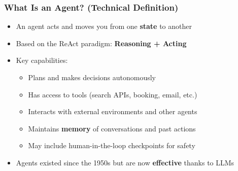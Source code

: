 \begin{frame}[fragile]\frametitle{What Is an Agent? (Technical Definition)}
\begin{itemize}
    \item An agent acts and moves you from one \textbf{state} to another
    \item Based on the ReAct paradigm: \textbf{Reasoning + Acting}
    \item Key capabilities:
    \begin{itemize}
        \item Plans and makes decisions autonomously
        \item Has access to tools (search APIs, booking, email, etc.)
        \item Interacts with external environments and other agents
        \item Maintains \textbf{memory} of conversations and past actions
        \item May include human-in-the-loop checkpoints for safety
    \end{itemize}
    \item Agents existed since the 1950s but are now \textbf{effective} thanks to LLMs
\end{itemize}
\end{frame}


